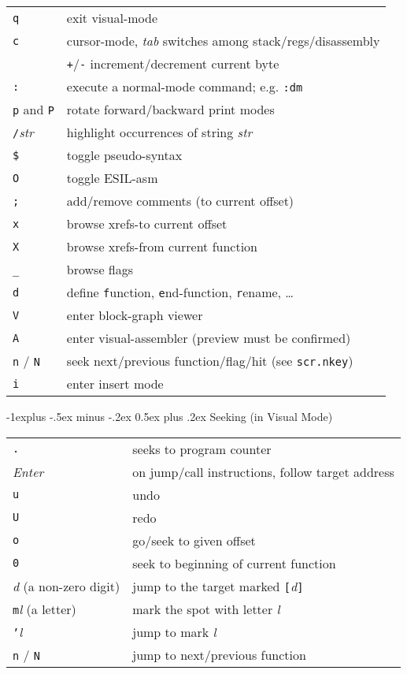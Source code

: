 \documentclass[a4paper,landscape]{article}
\makeatletter
\renewcommand{\subsection}{\@startsection{subsection}{2}{0mm}%
                                {-1explus -.5ex minus -.2ex}%
                                {0.5ex plus .2ex}%
                                {\normalfont\normalsize\bfseries}}
\makeatother
\begin{document}
\begin{multicols*}{3}
\begin{tabular}{@{}ll@{}}
\texttt{q} & exit visual-mode \\
\texttt{c} & cursor-mode, \textit{tab} switches among stack/regs/disassembly \\
& \texttt{+}/\texttt{-} increment/decrement current byte \\
\texttt{:} & execute a normal-mode command; e.g. \texttt{:dm} \\
\texttt{p} and \texttt{P} & rotate forward/backward print modes \\
\texttt{/}\textit{str} & highlight occurrences of string \textit{str} \\
\texttt{\$} & toggle pseudo-syntax \\
\texttt{O} & toggle ESIL-asm \\
\texttt{;} & add/remove comments (to current offset) \\
\texttt{x} & browse xrefs-to current offset \\
\texttt{X} & browse xrefs-from current function \\
\texttt{\_} & browse flags \\
\texttt{d} & define \texttt{f}unction, \texttt{e}nd-function, \texttt{r}ename, \ldots \\
\texttt{V} & enter block-graph viewer \\
\texttt{A} & enter visual-assembler (preview must be confirmed)\\
\texttt{n} / \texttt{N} & seek next/previous function/flag/hit (see \texttt{scr.nkey}) \\
\texttt{i} & enter insert mode \\
\end{tabular}
\subsection{Seeking (in Visual Mode)}
\begin{tabular}{@{}ll@{}}
\texttt{.} & seeks to program counter \\
\textit{Enter} & on jump/call instructions, follow target address \\
\texttt{u} & undo \\
\texttt{U} & redo \\
\texttt{o} & go/seek to given offset \\
\texttt{0} & seek to beginning of current function \\
\textit{d} (a non-zero digit) & jump to the target marked \texttt{[}\textit{d}\texttt{]} \\
\texttt{m}\textit{l} (a letter) & mark the spot with letter \textit{l} \\
\texttt{'}\textit{l} & jump to mark \textit{l} \\
\texttt{n} / \texttt{N} & jump to next/previous function \\
\end{tabular}

\end{multicols*}
\end{document}
